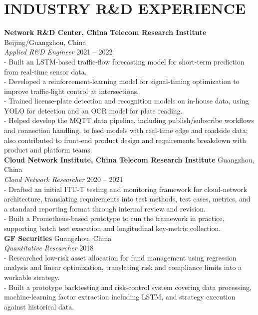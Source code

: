 \section*{INDUSTRY R\&D EXPERIENCE}
\noindent
\textbf{Network R\&D Center, China Telecom Research Institute} \hfill Beijing/Guangzhou, China\\ %
\textit{Applied R\&D Engineer}
   \hfill 2021 -- 2022 \\ %
- Built an LSTM-based traffic-flow forecasting model for short-term prediction from real-time sensor data. \\
- Developed a reinforcement-learning model for signal-timing optimization to improve traffic-light control at intersections. \\
- Trained license-plate detection and recognition models on in-house data, using YOLO for detection and an OCR model for plate reading. \\
- Helped develop the MQTT data pipeline, including publish/subscribe workflows and connection handling, to feed models with real-time edge and roadside data; also contributed to front-end product design and requirements breakdown with product and platform teams.\\

\noindent
\textbf{Cloud Network Institute, China Telecom Research Institute} \hfill Guangzhou, China\\ %
\textit{Cloud Network Researcher}
   \hfill 2020 -- 2021\\
- Drafted an initial ITU-T testing and monitoring framework for cloud-network architecture, translating requirements into test methods, test cases, metrics, and a standard reporting format through internal review and revision. \\
- Built a Prometheus-based prototype to run the framework in practice, supporting batch test execution and longitudinal key-metric collection. \\

\noindent
\textbf{GF Securities} \hfill Guangzhou, China\\ %
\textit{Quantitative Researcher}
   \hfill 2018\\ %
- Researched low-risk asset allocation for fund management using regression analysis and linear optimization, translating risk and compliance limits into a workable strategy.\\
- Built a prototype backtesting and risk-control system covering data processing, machine-learning factor extraction including LSTM, and strategy execution against historical data. \\
